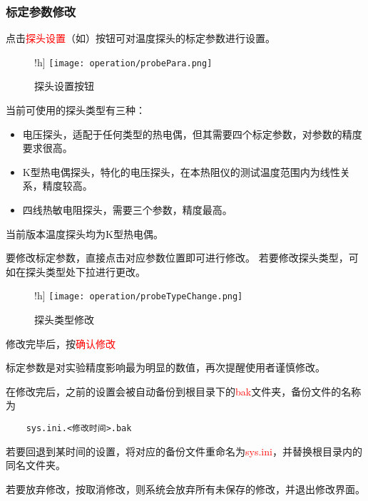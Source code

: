 \subsubsection*{标定参数修改}
点击\textcolor{red}{探头设置}（如）按钮可对温度探头的标定参数进行设置。
\begin{figure}!h]
    \centering
    \texttt{[image: operation/probePara.png]}
    \caption{  探头设置按钮 \label{fig:btnProbePara}}
\end{figure}
当前可使用的探头类型有三种：
\begin{itemize}
    \item 电压探头，适配于任何类型的热电偶，但其需要四个标定参数，对参数的精度要求很高。
    \item K型热电偶探头，特化的电压探头，在本热阻仪的测试温度范围内为线性关系，精度较高。
    \item 四线热敏电阻探头，需要三个参数，精度最高。
\end{itemize}
\begin{note}
    当前版本温度探头均为K型热电偶。
\end{note}
要修改标定参数，直接点击对应参数位置即可进行修改。
若要修改探头类型，可如在探头类型处下拉进行更改。
\begin{figure}!h]
    \centering
    \texttt{[image: operation/probeTypeChange.png]}
    \caption{  探头类型修改 \label{fig:probeTypeChange}}
\end{figure}
修改完毕后，按\textcolor{red}{确认修改}
\begin{note}
    标定参数是对实验精度影响最为明显的数值，再次提醒使用者谨慎修改。
\end{note}
在修改完后，之前的设置会被自动备份到根目录下的\textcolor{red}{bak}文件夹，备份文件的名称为

\begin{lstlisting}
    sys.ini.<修改时间>.bak
\end{lstlisting}
若要回退到某时间的设置，将对应的备份文件重命名为\textcolor{red}{sys.ini}，并替换根目录内的同名文件夹。
\par 若要放弃修改，按取消修改，则系统会放弃所有未保存的修改，并退出修改界面。
